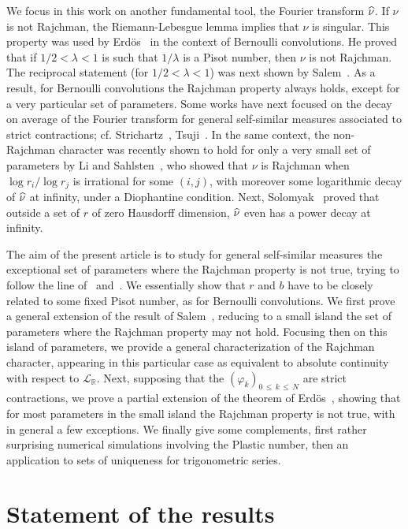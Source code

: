 \documentclass[AHL,Unicode,longabstracts,published]{cedram}
\newcommand{\Rbb}{\mathbb R}
\newcommand{\Lcl}{\mathcal{L}}
\let\oldhat\hat
\renewcommand*{\hat}[1]{\mathchoice{\widehat{#1}}{\widehat{#1}}{\oldhat{#1}}{\oldhat{#1}}}
\begin{document}
We focus in this work on another fundamental tool, the Fourier transform $\hat{\nu}$. If $\nu$ is not Rajchman, the Riemann-Lebesgue lemma implies that $\nu$ is singular. This property was used by Erd\"os~\cite{erdos} in the context of Bernoulli convolutions. He proved that if $1/2<\lambda<1$ is such that $1/\lambda$ is a Pisot number, then $\nu$ is not Rajchman. The reciprocal statement (for $1/2<\lambda<1$) was next shown by Salem~\cite{salem}. As a result, for Bernoulli convolutions the Rajchman property always holds, except for a very particular set of parameters. Some works have next focused on the decay on average of the Fourier transform for general self-similar measures associated to strict contractions; cf. Strichartz~\cite{stri1,stri2}, Tsuji~\cite{tsu}. In the same context, the non-Rajchman character was recently shown to hold for only a very small set of parameters by Li and Sahlsten~\cite{lisa}, who showed that $\nu$ is Rajchman when $\log r_i/\log r_j$ is irrational for some $(i,j)$, with moreover some logarithmic decay of $\hat{\nu}$ at infinity, under a Diophantine condition. Next, Solomyak~\cite{solo2} proved that outside a set of $r$ of zero Hausdorff dimension, $\hat{\nu}$ even has a power decay at infinity.

The aim of the present article is to study for general self-similar measures the exceptional set of parameters where the Rajchman property is not true, trying to follow the line of~\cite{erdos} and~\cite{salem}. We essentially show that $r$ and $b$ have to be closely related to some fixed Pisot number, as for Bernoulli convolutions. We first prove a general extension of the result of Salem~\cite{salem}, reducing to a small island the set of parameters where the Rajchman property may not hold. Focusing then on this island of parameters, we provide a general characterization of the Rajchman character, appearing in this particular case as equivalent to absolute continuity with respect to ${\Lcl}_{\Rbb}$. Next, supposing that the $(\varphi_k)_{0\,\leq\,k\,\leq\,N}$ are strict contractions, we prove a partial extension of the theorem of Erd\"os~\cite{erdos}, showing that for most parameters in the small island the Rajchman property is not true, with in general a few exceptions. We finally give some complements, first rather surprising numerical simulations involving the Plastic number, then an application to sets of uniqueness for trigonometric series.



\section{Statement of the results}\label{sect2}
\end{document}
